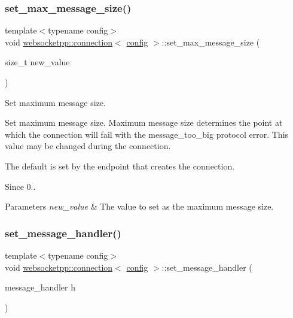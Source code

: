 \subsubsection{\texorpdfstring{set\+\_\+max\+\_\+message\+\_\+size()}{set\_max\_message\_size()}}
{\footnotesize\ttfamily template$<$typename config$>$ \\
void \mbox{\hyperlink{classwebsocketpp_1_1connection}{websocketpp\+::connection}}$<$ \mbox{\hyperlink{classconfig}{config}} $>$\+::set\+\_\+max\+\_\+message\+\_\+size (\begin{DoxyParamCaption}\item[{size\+\_\+t}]{new\+\_\+value }\end{DoxyParamCaption})\hspace{0.3cm}{\ttfamily [inline]}}



Set maximum message size. 

Set maximum message size. Maximum message size determines the point at which the connection will fail with the message\+\_\+too\+\_\+big protocol error. This value may be changed during the connection.

The default is set by the endpoint that creates the connection.

\begin{DoxySince}{Since}
0..
\end{DoxySince}

\begin{DoxyParams}{Parameters}
{\em new\+\_\+value} & The value to set as the maximum message size. \\
\hline
\end{DoxyParams}
\mbox{\label{classwebsocketpp_1_1connection_a107e754227c828582779b906654743fe}} 
\subsubsection{\texorpdfstring{set\+\_\+message\+\_\+handler()}{set\_message\_handler()}}
{\footnotesize\ttfamily template$<$typename config$>$ \\
void \mbox{\hyperlink{classwebsocketpp_1_1connection}{websocketpp\+::connection}}$<$ \mbox{\hyperlink{classconfig}{config}} $>$\+::set\+\_\+message\+\_\+handler (\begin{DoxyParamCaption}\item[{message\+\_\+handler}]{h }\end{DoxyParamCaption})\hspace{0.3cm}{\ttfamily [inline]}}



